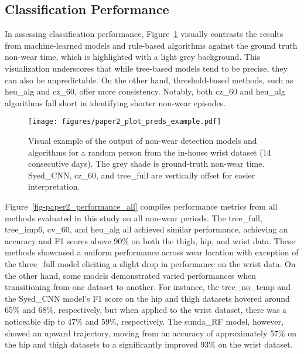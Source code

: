 \documentclass[
  10pt,
]{scrbook}
\begin{document}
\hypertarget{classification-performance}{%
\subsection{Classification
Performance}\label{classification-performance}}

In assessing classification performance,
Figure~\ref{fig-paper2_preds_ex} visually contrasts the results from
machine-learned models and rule-based algorithms against the ground
truth non-wear time, which is highlighted with a light grey background.
This visualization underscores that while tree-based models tend to be
precise, they can also be unpredictable. On the other hand,
threshold-based methods, such as heu\_alg and cz\_60, offer more
consistency. Notably, both cz\_60 and heu\_alg algorithms fall short in
identifying shorter non-wear episodes.

\begin{figure}

{\centering \texttt{[image: figures/paper2\_plot\_preds\_example.pdf]}

}

\caption{\label{fig-paper2_preds_ex}Visual example of the output of
non-wear detection models and algorithms for a random person from the
in-house wrist dataset (14 consecutive days). The grey shade is
ground-truth non-wear time. Syed\_CNN, cz\_60, and tree\_full are
vertically offset for easier interpretation.}

\end{figure}

Figure~\ref{fig-paper2_performance_all} compiles performance metrics
from all methods evaluated in this study on all non-wear periods. The
tree\_full, tree\_imp6, cv\_60, and heu\_alg all achieved similar
performance, achieving an accuracy and F1 scores above 90\% on both the
thigh, hip, and wrist data. These methods showcased a uniform
performance across wear location with exception of the three\_full model
eliciting a slight drop in performance on the wrist data. On the other
hand, some models demonstrated varied performances when transitioning
from one dataset to another. For instance, the tree\_no\_temp and the
Syed\_CNN model's F1 score on the hip and thigh datasets hovered around
65\% and 68\%, respectively, but when applied to the wrist dataset,
there was a noticeable dip to 47\% and 59\%, respectively. The sunda\_RF
model, however, showed an upward trajectory, moving from an accuracy of
approximately 57\% on the hip and thigh datasets to a significantly
improved 93\% on the wrist dataset.
\end{document}
